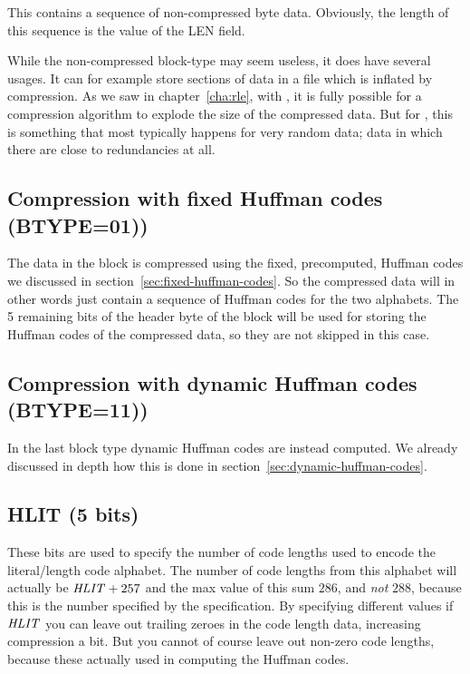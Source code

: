 This contains a sequence of non-compressed byte data. Obviously, the
length of this sequence is the value of the LEN field.

While the non-compressed block-type may seem useless, it does have
several usages. It can for example store sections of data in a file
which is inflated by compression. As we saw in chapter~\ref{cha:rle},
with \rle, it is fully possible for a compression algorithm to explode
the size of the compressed data. But for , this is something
that most typically happens for very random data; data in which there
are close to redundancies at all.

\subsection{Compression with fixed Huffman codes (BTYPE=01))}

The data in the block is compressed using the fixed, precomputed,
Huffman codes we discussed in
section~\ref{sec:fixed-huffman-codes}. So the compressed data will in
other words just contain a sequence of Huffman codes for the two
alphabets. The 5 remaining bits of the header byte of the block will
be used for storing the Huffman codes of the compressed data, so they
are not skipped in this case.

\subsection{Compression with dynamic Huffman codes (BTYPE=11))}

In the last block type dynamic Huffman codes are instead computed. We
already discussed in depth how this is done in
section~\ref{sec:dynamic-huffman-codes}.

\subsection{HLIT (5 bits)}

These bits are used to specify the number of code lengths used to
encode the literal/length code alphabet. The number of code lengths
from this alphabet will actually be $\mathit{HLIT} + 257$ and the max
value of this sum $286$, and \textit{not} $288$, because this is the
number specified by the  specification. By specifying different
values if $\mathit{HLIT}$ you can leave out trailing zeroes in the code
length data, increasing compression a bit. But you cannot of course
leave out non-zero code lengths, because these actually used in
computing the Huffman codes.

